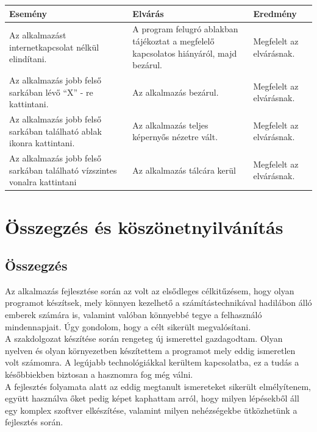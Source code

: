 \documentclass[a4paper,12pt]{report}
\begin{document}
    \begin{center}
        \begin{tabular}{ | m{4.5cm} | m{4.5cm} | m{4.5cm} |}
            \hline
            Esemény & Elvárás & Eredmény \\ \hline
            Az alkalmazást internetkapcsolat nélkül elindítani. & A program felugró ablakban tájékoztat a megfelelő kapcsolatos hiányáról,
            majd bezárul. & Megfelelt az elvárásnak.\\ \hline
            Az alkalmazás jobb felső sarkában lévő ``X'' - re kattintani. & Az alkalmazás bezárul. & Megfelelt az elvárásnak.\\ \hline
            Az alkalmazás jobb felső sarkában található ablak ikonra kattintani. & Az alkalmazás teljes képernyős nézetre vált. &
            Megfelelt az elvárásnak.\\ \hline
            Az alkalmazás jobb felső sarkában található vízszintes vonalra kattintani & Az alkalmazás tálcára kerül & Megfelelt az elvárásnak.\\
            \hline
        \end{tabular}
    \end{center}

    \chapter{Összegzés és köszönetnyilvánítás}

    \section{Összegzés}
    Az alkalmazás fejlesztése során az volt az elsődleges célkitűzésem, hogy olyan programot készítsek, mely könnyen kezelhető
    a számítástechnikával hadilábon álló emberek számára is, valamint valóban könnyebbé tegye a felhasználó mindennapjait. Úgy
    gondolom, hogy a célt sikerült megvalósítani.\\
    A szakdolgozat készítése során rengeteg új ismerettel gazdagodtam. Olyan nyelven és olyan környezetben készítettem a programot
    mely eddig ismeretlen volt számomra. A legújabb technológiákkal kerültem kapcsolatba, ez a tudás a későbbiekben biztosan
    a hasznomra fog még válni.\\
    A fejlesztés folyamata alatt az eddig megtanult ismereteket sikerült elmélyítenem, együtt használva őket pedig képet kaphattam
    arról, hogy milyen lépésekből áll egy komplex szoftver elkészítése, valamint milyen nehézségekbe ütközhetünk a fejlesztés során.
\end{document}
